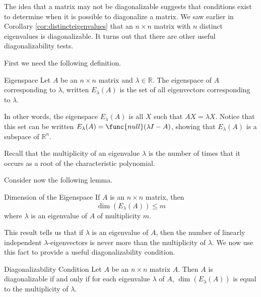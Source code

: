 The idea that a matrix may not be diagonalizable suggests that conditions exist to determine when it is possible to diagonalize a matrix. We saw earlier in Corollary \ref{cor:distincteigenvalues} that an $n \times n$ matrix with $n$ distinct eigenvalues is diagonalizable. It turns out that there are other useful diagonalizability tests. 

First we need the following definition.

\begin{definition}{Eigenspace}\label{def:eigenspace}
Let $A$ be an $n\times n$ matrix and $\lambda\in\mathbb{R}$.
The eigenspace of $A$ corresponding to $\lambda$, written $E_{\lambda}(A)$
is the set of all eigenvectors corresponding to $\lambda$. 
\end{definition}

In other words, the eigenspace $E_{\lambda}(A)$ is all $X$ such that $AX = \lambda X$. Notice that this set can be written $E_{\lambda}(A) = \func{null}(\lambda I - A)$, showing that $E_{\lambda}(A)$ is a subspace of $\mathbb{R}^n$. 

Recall that the multiplicity of an eigenvalue $\lambda$ is the number of times that it occurs as a root of the characteristic polynomial.

Consider now the following lemma.

\begin{lemma}{Dimension of the Eigenspace}\label{lem:dimensioneigenspace}
If $A$ is an $n\times n$ matrix,  then 
\[ \dim(E_{\lambda}(A))\leq m\]
where $\lambda$ is an
eigenvalue of $A$ of multiplicity $m$.
\end{lemma}

This result tells us that if $\lambda$ is an eigenvalue of $A$, then
the number of linearly independent $\lambda$-eigenvectors
is never more than the multiplicity of $\lambda$. We now use this fact to provide a useful diagonalizability condition.

\begin{theorem}{Diagonalizability Condition}\label{thm:diagonalizability}
Let $A$ be an $n \times n$ matrix $A$. Then $A$ is diagonalizable if and only if for each eigenvalue $\lambda$ of $A$, $\dim(E_{\lambda}(A))$ is equal to the multiplicity of $\lambda$.
\end{theorem}

